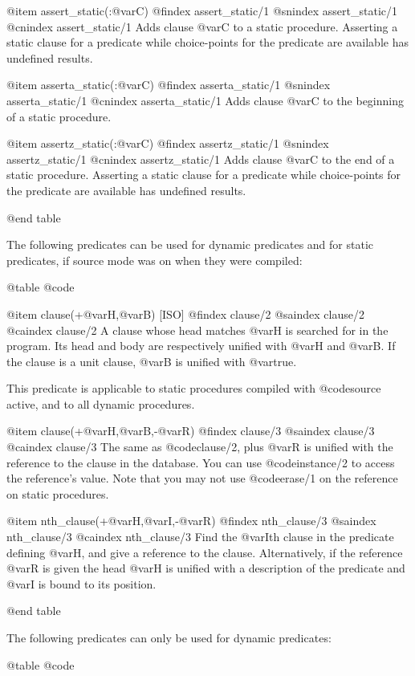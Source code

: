 {{{{{@item assert_static(:@var{C})
@findex assert_static/1
@snindex assert_static/1
@cnindex assert_static/1
Adds clause @var{C} to a static procedure. Asserting a static clause
for a predicate while choice-points for the predicate are available has
undefined results.

@item asserta_static(:@var{C})
@findex asserta_static/1
@snindex asserta_static/1
@cnindex asserta_static/1
 Adds clause @var{C} to the beginning of a static procedure. 

@item assertz_static(:@var{C})
@findex assertz_static/1
@snindex assertz_static/1
@cnindex assertz_static/1
 Adds clause @var{C} to the end of a static procedure.  Asserting a
static clause for a predicate while choice-points for the predicate are
available has undefined results.

@end table

The following predicates can be used for dynamic predicates and for
static predicates, if source mode was on when they were compiled:

@table @code

@item clause(+@var{H},@var{B}) [ISO]
@findex clause/2
@saindex clause/2
@caindex clause/2
  A clause whose head matches @var{H} is searched for in the
program. Its head and body are respectively unified with @var{H} and
@var{B}. If the clause is a unit clause, @var{B} is unified with
@var{true}.

This predicate is applicable to static procedures compiled with
@code{source} active, and to all dynamic procedures.

@item clause(+@var{H},@var{B},-@var{R})
@findex clause/3
@saindex clause/3
@caindex clause/3
The same as @code{clause/2}, plus @var{R} is unified with the
reference to the clause in the database. You can use @code{instance/2}
to access the reference's value. Note that you may not use
@code{erase/1} on the reference on static procedures.

@item nth_clause(+@var{H},@var{I},-@var{R})
@findex nth_clause/3
@saindex nth_clause/3
@caindex nth_clause/3
Find the @var{I}th clause in the predicate defining @var{H}, and give
a reference to the clause. Alternatively, if the reference @var{R} is
given the head @var{H} is unified with a description of the predicate
and @var{I} is bound to its position.

@end table

The following predicates can only be used for dynamic predicates:

@table @code

}}}}}
